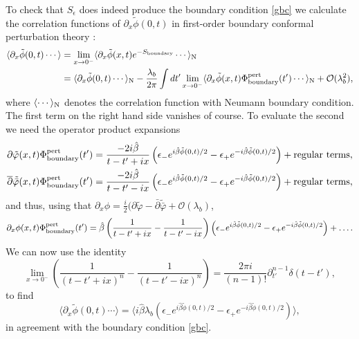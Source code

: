 \documentclass[a4paper,12pt]{article}
\newcommand{\hb}{\hat{\beta}}
\numberwithin{equation}{section}
\begin{document}
To check that $S_\epsilon$ does indeed produce the boundary
condition \eqref{gbc} we calculate the correlation functions of
$\partial_x\tilde{\phi}(0,t)$ in first-order boundary conformal
perturbation theory \cite{Gho94,Pen95}:
\begin{align}
  \langle \partial_x\tilde{\phi}(0,t)\cdots\rangle
  &=\lim_{x\rightarrow 0^-}\langle \partial_x\tilde{\phi}(x,t)
  e^{-S_{\text{boundary}}}\cdots\rangle_{\text{N}}\\
  &=\langle \partial_x\tilde{\phi}(0,t)\cdots\rangle_{\text{N}}
  -\frac{\lambda_b}{2\pi}\int dt'
  \lim_{x\rightarrow 0^-}\langle \partial_x\tilde{\phi}(x,t)
  \Phi^{\rm pert}_{\rm boundary}(t')\cdots\rangle_{\text{N}}
  +{\mathcal O}(\lambda_b^2),\nonumber
\end{align}
where $\langle \cdots\rangle_{\text N}$ denotes the correlation
function with Neumann boundary condition. The first term on the
right hand side vanishes of course. To evaluate the second we need
the operator product expansions
\begin{align*}
  \partial\tilde{\varphi}(x,t)\Phi^{\rm pert}_{\rm boundary}(t')&=
  \frac{-2i\hb}{t-t'+ix}\left(
  \epsilon_- e^{i\hb\tilde{\phi}(0,t)/2}-
  \epsilon_+e^{-i\hb\tilde{\phi}(0,t)/2}\right)
  +\text{regular terms},\\
  \overline{\partial}\tilde{\bar{\varphi}}(x,t)
  \Phi^{\rm pert}_{\rm boundary}(t')&=
  \frac{-2i\hb}{t-t'-ix}\left(
  \epsilon_- e^{i\hb\tilde{\phi}(0,t)/2}-
  \epsilon_+e^{-i\hb\tilde{\phi}(0,t)/2}\right)
  +\text{regular terms},
\end{align*}
and thus, using that $\partial_x\phi=\frac
i2(\partial\tilde{\varphi}-\bar{\partial}{\tilde{\bar{\varphi}}}+{\mathcal
O}(\lambda_b)$,
\begin{equation}
  \partial_x\phi(x,t)\Phi^{\rm pert}_{\rm boundary}(t')=\hb
  \left(\frac{1}{t-t'+ix}-\frac{1}{t-t'-ix}\right)\left(
  \epsilon_- e^{i\hb\tilde{\phi}(0,t)/2}-
  \epsilon_+e^{-i\hb\tilde{\phi}(0,t)/2}\right)
  +\dots.
\end{equation}
We can now use the identity
\begin{equation}
  \lim_{x\rightarrow 0^-}
  \left(\frac{1}{(t-t'+ix)^n}-\frac{1}{(t-t'-ix)^n}\right)
  =\frac{2\pi i}{(n-1)!}\partial_{t'}^{n-1}\delta(t-t'),
\end{equation}
to find
\begin{equation}
  \langle \partial_x\tilde{\phi}(0,t)\cdots\rangle=
  \langle i\hb\lambda_b\left(
  \epsilon_- e^{i\hb\tilde{\phi}(0,t)/2}-
  \epsilon_+e^{-i\hb\tilde{\phi}(0,t)/2}\right)\rangle,
\end{equation}
in agreement with the boundary condition \eqref{gbc}.
\end{document}
